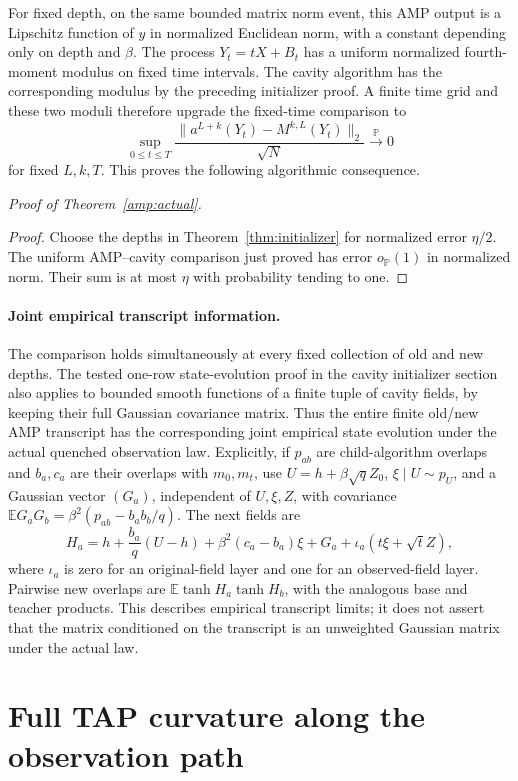 \documentclass[11pt,reqno]{amsart}
\begin{document}
For fixed depth, on the same bounded matrix norm event, this AMP output
is a Lipschitz function of $y$ in normalized Euclidean norm, with a
constant depending only on depth and $\beta$.  The process
$Y_t=tX+B_t$ has a uniform normalized fourth-moment modulus on fixed
time intervals.  The cavity algorithm has the corresponding modulus by
the preceding initializer proof.  A finite time grid and these two
moduli therefore upgrade the fixed-time comparison to
\[
 \sup_{0\le t\le T}\frac{\|a^{L+k}(Y_t)-M^{k,L}(Y_t)\|_2}{\sqrt N}
 \xrightarrow{\mathbb P}0
\]
for fixed $L,k,T$.  This proves the following algorithmic consequence.

\medskip\noindent\emph{Proof of Theorem~\ref{amp:actual}.}
\begin{proof}
Choose the depths in Theorem~\ref{thm:initializer} for normalized error
$\eta/2$. The uniform AMP--cavity comparison just proved has error
$o_{\mathbb P}(1)$ in normalized norm. Their sum is at most $\eta$ with
probability tending to one.
\end{proof}

\paragraph{Joint empirical transcript information.}
The comparison holds simultaneously at every fixed collection of old and
new depths.  The tested one-row state-evolution proof in the cavity
initializer section also applies to bounded smooth functions of a finite
tuple of cavity fields, by keeping their full Gaussian covariance matrix.
Thus the entire finite old/new AMP transcript has the corresponding joint
empirical state evolution under the actual quenched observation law.
Explicitly, if $p_{ab}$ are child-algorithm overlaps and $b_a,c_a$ are
their overlaps with $m_0,m_t$, use $U=h+\beta\sqrt q Z_0$, $\xi\mid U\sim p_U$,
and a Gaussian vector $(G_a)$, independent of $U,\xi,Z$, with covariance
$\mathbb E G_aG_b=\beta^2(p_{ab}-b_ab_b/q)$.  The next fields are
\[
 H_a=h+\frac{b_a}{q}(U-h)+\beta^2(c_a-b_a)\xi+G_a
           +\iota_a(t\xi+\sqrt t Z),
\]
where $\iota_a$ is zero for an original-field layer and one for an
observed-field layer.  Pairwise new overlaps are
$\mathbb E\tanh H_a\tanh H_b$, with the analogous base and teacher
products.  This describes empirical transcript limits; it does not assert
that the matrix conditioned on the transcript is an unweighted Gaussian
matrix under the actual law.


\section{Full TAP curvature along the observation path}\label{curv:section}
\end{document}
